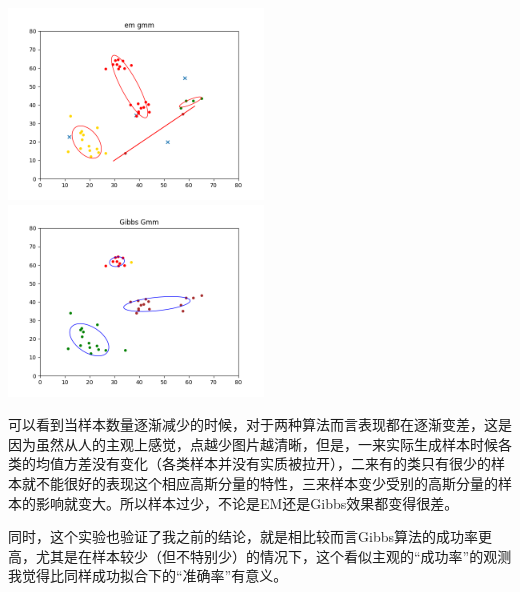 \documentclass[hyperref,UTF8]{ctexart}
\begin{document}
\centerline{\includegraphics[height=2in]{exp-results/EM-40.png}\includegraphics[height=2in]{exp-results/Gibbs-40.png}}

\par 可以看到当样本数量逐渐减少的时候，对于两种算法而言表现都在逐渐变差，这是因为虽然从人的主观上感觉，点越少图片越清晰，但是，一来实际生成样本时候各类的均值方差没有变化（各类样本并没有实质被拉开），二来有的类只有很少的样本就不能很好的表现这个相应高斯分量的特性，三来样本变少受别的高斯分量的样本的影响就变大。所以样本过少，不论是EM还是Gibbs效果都变得很差。
\par 同时，这个实验也验证了我之前的结论，就是相比较而言Gibbs算法的成功率更高，尤其是在样本较少（但不特别少）的情况下，这个看似主观的“成功率”的观测我觉得比同样成功拟合下的“准确率”有意义。
\end{document}

